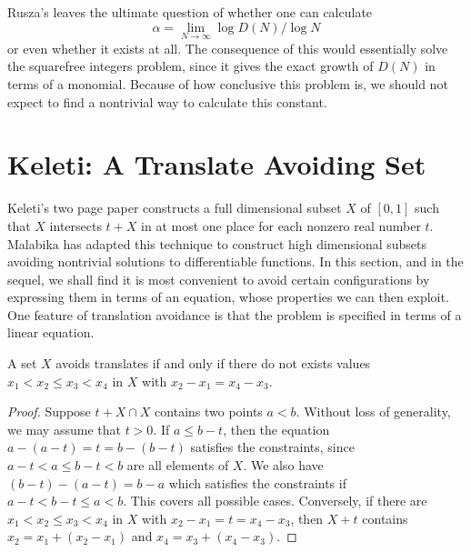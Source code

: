 Rusza's leaves the ultimate question of whether one can calculate
%
\[ \alpha = \lim_{N \to \infty} \log D(N) / \log N \]
%
or even whether it exists at all. The consequence of this would essentially solve the squarefree integers problem, since it gives the exact growth of $D(N)$ in terms of a monomial. Because of how conclusive this problem is, we should not expect to find a nontrivial way to calculate this constant.









\section{Keleti: A Translate Avoiding Set}

Keleti's two page paper constructs a full dimensional subset $X$ of $[0,1]$ such that $X$ intersects $t + X$ in at most one place for each nonzero real number $t$. Malabika has adapted this technique to construct high dimensional subsets avoiding nontrivial solutions to differentiable functions. In this section, and in the sequel, we shall find it is most convenient to avoid certain configurations by expressing them in terms of an equation, whose properties we can then exploit. One feature of translation avoidance is that the problem is specified in terms of a linear equation.

\begin{lemma}
    A set $X$ avoids translates if and only if there do not exists values $x_1 < x_2 \leq x_3 < x_4$ in $X$ with $x_2 - x_1 = x_4 - x_3$.
\end{lemma}
\begin{proof}

    Suppose $t + X \cap X$ contains two points $a < b$. Without loss of generality, we may assume that $t > 0$. If $a \leq b - t$, then the equation $a - (a - t) = t = b - (b - t)$ satisfies the constraints, since $a - t < a \leq b - t < b$ are all elements of $X$. We also have $(b - t) - (a - t) = b - a$ which satisfies the constraints if $a - t < b - t \leq a < b$. This covers all possible cases. Conversely, if there are $x_1 < x_2 \leq x_3 < x_4$ in $X$ with $x_2 - x_1 = t = x_4 - x_3$, then $X + t$ contains $x_2 = x_1 + (x_2 - x_1)$ and $x_4 = x_3 + (x_4 - x_3)$.
\end{proof}


